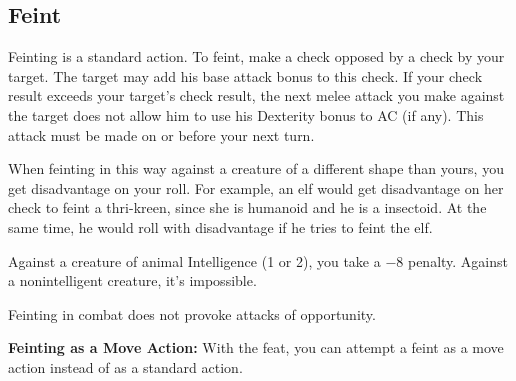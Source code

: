 \subsection{Feint}
Feinting is a standard action. To feint, make a  check opposed by a  check by your target. The target may add his base attack bonus to this  check. If your  check result exceeds your target's  check result, the next melee attack you make against the target does not allow him to use his Dexterity bonus to AC (if any). This attack must be made on or before your next turn.

When feinting in this way against a creature of a different shape than yours, you get disadvantage on your roll. For example, an elf would get disadvantage on her  check to feint a thri-kreen, since she is humanoid and he is a insectoid. At the same time, he would roll with disadvantage if he tries to feint the elf.

Against a creature of animal Intelligence (1 or 2), you take a $-8$ penalty. Against a nonintelligent creature, it's impossible.

Feinting in combat does not provoke attacks of opportunity.

\textbf{Feinting as a Move Action:} With the  feat, you can attempt a feint as a move action instead of as a standard action.